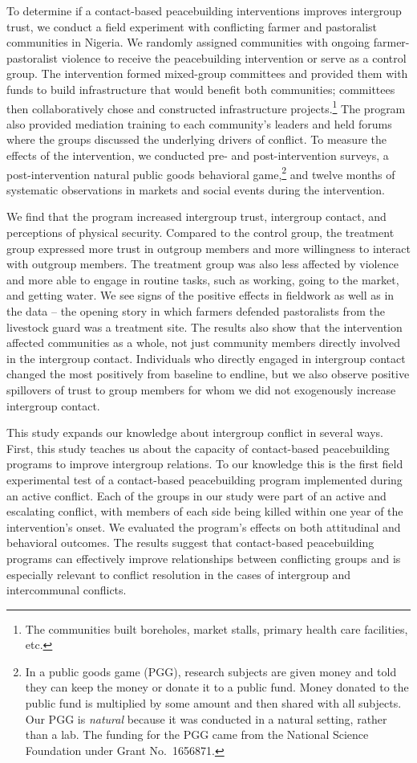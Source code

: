 \documentclass[11pt]{article}
\begin{document}
To determine if a contact-based peacebuilding interventions improves
intergroup trust, we conduct a field experiment with conflicting farmer
and pastoralist communities in Nigeria. We randomly assigned communities
with ongoing farmer-pastoralist violence to receive the peacebuilding
intervention or serve as a control group. The intervention formed
mixed-group committees and provided them with funds to build
infrastructure that would benefit both communities; committees then
collaboratively chose and constructed infrastructure projects.\footnote{The
  communities built boreholes, market stalls, primary health care
  facilities, etc.} The program also provided mediation training to each
community's leaders and held forums where the groups discussed the
underlying drivers of conflict. To measure the effects of the
intervention, we conducted pre- and post-intervention surveys, a
post-intervention natural public goods behavioral game,\footnote{In a
  public goods game (PGG), research subjects are given money and told
  they can keep the money or donate it to a public fund. Money donated
  to the public fund is multiplied by some amount and then shared with
  all subjects. Our PGG is \emph{natural} because it was conducted in a
  natural setting, rather than a lab. The funding for the PGG came from
  the National Science Foundation under Grant No.~1656871.} and twelve
months of systematic observations in markets and social events during
the intervention.

We find that the program increased intergroup trust, intergroup contact,
and perceptions of physical security. Compared to the control group, the
treatment group expressed more trust in outgroup members and more
willingness to interact with outgroup members. The treatment group was
also less affected by violence and more able to engage in routine tasks,
such as working, going to the market, and getting water. We see signs of
the positive effects in fieldwork as well as in the data -- the opening
story in which farmers defended pastoralists from the livestock guard
was a treatment site. The results also show that the intervention
affected communities as a whole, not just community members directly
involved in the intergroup contact. Individuals who directly engaged in
intergroup contact changed the most positively from baseline to endline,
but we also observe positive spillovers of trust to group members for
whom we did not exogenously increase intergroup contact.

This study expands our knowledge about intergroup conflict in several
ways. First, this study teaches us about the capacity of contact-based
peacebuilding programs to improve intergroup relations. To our knowledge
this is the first field experimental test of a contact-based
peacebuilding program implemented during an active conflict. Each of the
groups in our study were part of an active and escalating conflict, with
members of each side being killed within one year of the intervention's
onset. We evaluated the program's effects on both attitudinal and
behavioral outcomes. The results suggest that contact-based
peacebuilding programs can effectively improve relationships between
conflicting groups and is especially relevant to conflict resolution in
the cases of intergroup and intercommunal conflicts.
\end{document}
